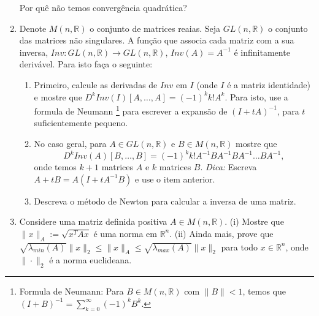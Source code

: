 \documentclass[a4paper,latin]{article}
\begin{document}
\begin{enumerate}
    Por quê não temos convergência quadrática?    
    \item Denote $M(n,\mathbb{R})$ o conjunto de matrices reaias. Seja $GL(n,\mathbb{R})$ o conjunto das matrices não singulares.
    A função que associa cada matriz com a sua inversa, 
    $Inv: GL(n,\mathbb{R}) \rightarrow GL(n,\mathbb{R})$, $Inv(A)=A ^{-1}$ é infinitamente derivável.
    Para isto faça o seguinte:
      \begin{enumerate}
      \item Primeiro, calcule as 
      derivadas de $Inv$ em $I$ 
      (onde $I$ é a matriz identidade) e mostre que $D^{k}Inv(I)[A,\dots,A]=(-1)^{k}k!A^{k}$.
      Para isto, use a formula de Neumann
      \footnote{Formula de Neumann: 
      Para $B \in M(n,\mathbb{R})$ 
      com $\|B\|<1$, temos que  
      $(I+B)^{-1}=
      \sum_{k=0}^{\infty} (-1)^{k}B^{k}$.}
      para escrever a expansão de $(I+tA)^{-1}$, 
      para $t$ suficientemente pequeno.
      \item No caso geral, 
      para $A \in GL(n,\mathbb{R})$ e 
      $B \in M(n,\mathbb{R})$ mostre que 
      $$
       D^{k}Inv(A)[B,\dots,B]=
       (-1)^{k}k! A^{-1} B A^{-1} B A^{-1}\dots B A^{-1}, 
      $$ 
      onde temos $k+1$ matrices $A$ e $k$ matrices $B$. 
      {\it Dica:} Escreva $A+tB=A(I+tA^{-1}B)$ e use o item anterior.
      \item Descreva o método de Newton para 
      calcular a inversa de uma matriz. 
      \end{enumerate}
   \item Considere uma matriz definida positiva $A \in M(n,\mathbb{R})$. (i) Mostre que 
   $\|x\|_{A}:=\sqrt{x^{T}Ax}$ é uma norma em $\mathbb{R}^{n}$.
   (ii) Ainda mais, prove que 
   $\sqrt{\lambda_{min}(A)}\|x\|_{2}\leq \|x\|_{A} \leq \sqrt{\lambda_{max}(A)}\|x\|_{2}$ para todo $x \in \mathbb{R}^{n}$, 
   onde $\|\cdot\|_{2}$ é a norma euclideana.
      

\end{enumerate}
\end{document}
